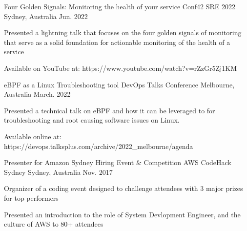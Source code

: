 

\begin{cventries}

  \cventry
    {Four Golden Signals: Monitoring the health of your service} %
    {Conf42 SRE 2022} %
    {Sydney, Australia} %
    {Jun. 2022} %
    {
      \begin{cvitems} %
        \item {Presented a lightning talk that focuses on the four golden signals of monitoring that serve as a solid foundation for actionable monitoring of the health of a service}
        \item {Available on YouTube at: https://www.youtube.com/watch?v=rZzGr5Zj1KM}
      \end{cvitems}
    }

  \cventry
    {eBPF as a Linux Troubleshooting tool} %
    {DevOps Talks Conference} %
    {Melbourne, Australia} %
    {March. 2022} %
    {
      \begin{cvitems} %
        \item {Presented a technical talk on eBPF and how it can be leveraged to for troubleshooting and root causing software issues on Linux.}
        \item {Available online at: https://devops.talksplus.com/archive/2022_melbourne/agenda}
      \end{cvitems}
    }


  \cventry
    {Presenter for Amazon Sydney Hiring Event \& Competition} %
    {AWS CodeHack Sydney} %
    {Sydney, Australia} %
    {Nov. 2017} %
    {
      \begin{cvitems} %
        \item {Organizer of a coding event designed to challenge attendees with 3 major prizes for top performers}
        \item {Presented an introduction to the role of System Devlopment Engineer, and the culture of AWS to 80+ attendees}
      \end{cvitems}
    }


\end{cventries}
